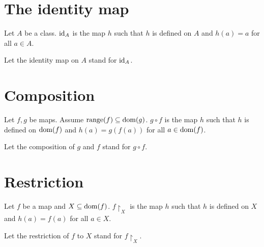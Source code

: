 \documentclass[../set-theory.tex]{subfiles}
\begin{document}
  \section{The identity map}

  \begin{forthel}
    \begin{definition}\label{SET_THEORY_06_1920902360989696}
      Let $A$ be a class.
      $\operatorname{id}_{A}$ is the map $h$ such that $h$ is defined on $A$ and $h(a) = a$ for all $a \in A$.
    \end{definition}

    Let the identity map on $A$ stand for $\operatorname{id}_{A}$.
  \end{forthel}


  \section{Composition}

  \begin{forthel}
    \begin{definition}\label{SET_THEORY_06_7605717729017856}
      Let $f, g$ be maps.
      Assume $\operatorname{range}(f) \subseteq \operatorname{dom}(g)$.
      $g \circ f$ is the map $h$ such that $h$ is defined on $\operatorname{dom}(f)$ and $h(a) = g(f(a))$ for all $a \in \operatorname{dom}(f)$.
    \end{definition}

    Let the composition of $g$ and $f$ stand for $g \circ f$.
  \end{forthel}


  \section{Restriction}

  \begin{forthel}
    \begin{definition}\label{SET_THEORY_06_7095412741636096}
      Let $f$ be a map and $X \subseteq \operatorname{dom}(f)$.
      $f \restriction_{X}$ is the map $h$ such that $h$ is defined on $X$ and $h(a) = f(a)$ for all $a \in X$.
    \end{definition}

    Let the restriction of $f$ to $X$ stand for $f \restriction_{X}$.
  \end{forthel}
\end{document}
